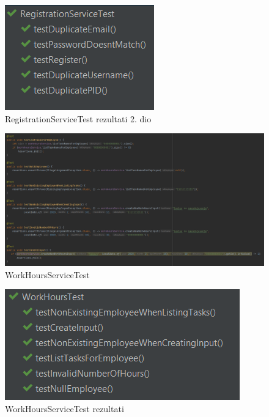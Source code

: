 				\begin{figure}[H] 					\centering 					                    \includegraphics[width=\textwidth]{Dokumentacija/ispit-komp/RegistrationServiceTest - rezultati.png}
				\caption{RegistrationServiceTest rezultati 2. dio}
				\end{figure}
				
				
				\begin{figure}[H] 					\centering 				\includegraphics[width=\textwidth]{Dokumentacija/ispit-komp/WorkHoursServiceTest.png}
				\caption{WorkHoursServiceTest}
				\end{figure}
                \begin{figure}[H] 					\centering 					                    \includegraphics[width=\textwidth]{Dokumentacija/ispit-komp/WorkHoursServiceTest - rezultati.png}
				\caption{WorkHoursServiceTest rezultati}
				\end{figure}
				
